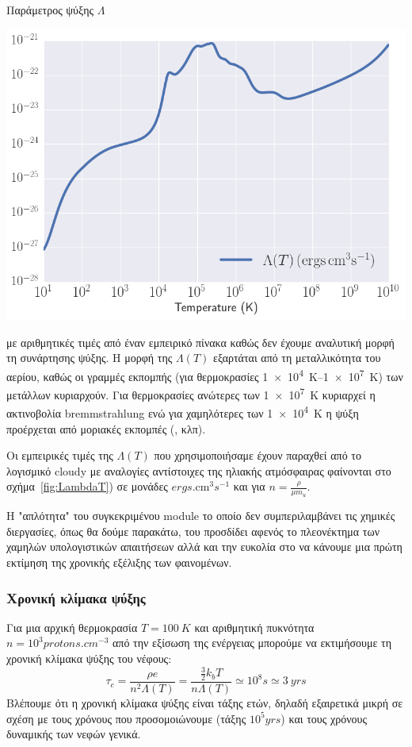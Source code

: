 		\begin{marginfigure}
		\caption{Παράμετρος ψύξης $\Lambda$}
		\includegraphics[width=1.0\linewidth]{Images/LambdaT}
		\label{fig:LambdaT}
	\end{marginfigure}
 με αριθμητικές τιμές από έναν εμπειρικό πίνακα καθώς δεν έχουμε αναλυτική μορφή τη συνάρτησης ψύξης. 
 Η μορφή της $\Lambda(T)$ εξαρτάται από τη μεταλλικότητα του αερίου, καθώς οι γραμμές εκπομπής (για θερμοκρασίες \SIrange{1e4}{1e7}{K}) των μετάλλων κυριαρχούν. Για θερμοκρασίες ανώτερες των \SI{1e7}{K} κυριαρχεί η ακτινοβολία bremmstrahlung ενώ για χαμηλότερες των \SI{1e4}{K} η ψύξη προέρχεται από μοριακές εκπομπές (, κλπ). 
 
 Οι εμπειρικές τιμές της $\Lambda(T)$ που χρησιμοποιήσαμε έχουν παραχθεί από το λογισμικό cloudy με αναλογίες αντίστοιχες της ηλιακής ατμόσφαιρας φαίνονται στο σχήμα~\ref{fig:LambdaT}) σε μονάδες $ \si{ergs.\cm^3 s^{-1}}$ και για  $n=\frac{\rho}{\mu m_u}$.

Η "απλότητα" του συγκεκριμένου module το οποίο δεν συμπεριλαμβάνει τις χημικές διεργασίες, όπως θα δούμε παρακάτω, του προσδίδει αφενός το πλεονέκτημα των χαμηλών υπολογιστικών απαιτήσεων αλλά και την ευκολία στο να κάνουμε μια πρώτη εκτίμηση της χρονικής εξέλιξης των φαινομένων.      
	
	\subsubsection{Χρονική κλίμακα ψύξης}
	Για μια αρχική θερμοκρασία $T=\SI{100}{K}$ και αριθμητική πυκνότητα $n=10^3\si{protons.cm^{-3}}$ από την εξίσωση της ενέργειας μπορούμε να εκτιμήσουμε τη χρονική κλίμακα ψύξης του νέφους:
	\begin{equation}
		\tau _c =\frac{ \rho e} {n^2 \Lambda (T)}=
		\frac{ \frac{3}{2}k_b T} {n \Lambda (T)} 
		\simeq 10^8\si{s}\simeq \SI{3}{yrs}
	\end{equation}
	Βλέπουμε ότι η χρονική κλίμακα ψύξης είναι τάξης ετών, δηλαδή εξαιρετικά μικρή σε σχέση με τους χρόνους που προσομοιώνουμε (τάξης $10^5\si{yrs}$) και τους χρόνους δυναμικής των νεφών γενικά.
	

